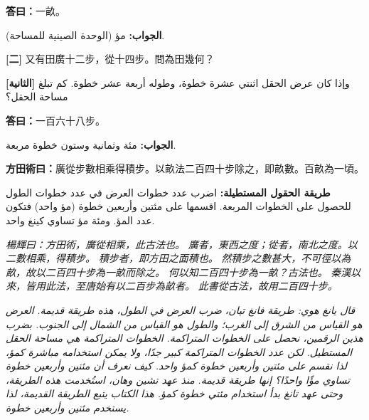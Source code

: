 \documentclass[11pt,a4paper]{article}
\newcommand{\bilingualrow}[2]{%
\noindent\begin{minipage}[t]{0.48\textwidth}#1\end{minipage}\hfill\begin{minipage}[t]{0.48\textwidth}\arabicfont\beginR #2\endR\end{minipage}\par\vspace{0.5cm}}
\begin{document}
\bilingualrow{
\textcolor{answercolor}{\textbf{答曰：}}一畝。
}{
\textcolor{answercolor}{\textbf{الجواب:}} مؤ (الوحدة الصينية للمساحة).
}

\bilingualrow{
\textbf{[二]} 又有田廣十二步，從十四步。問為田幾何？
}{
\textbf{[الثانية]} وإذا كان عرض الحقل اثنتي عشرة خطوة، وطوله أربعة عشر خطوة. كم تبلغ مساحة الحقل؟
}

\bilingualrow{
\textcolor{answercolor}{\textbf{答曰：}}一百六十八步。
}{
\textcolor{answercolor}{\textbf{الجواب:}} مئة وثمانية وستون خطوة مربعة.
}

\vspace{0.5em}

\bilingualrow{
\textcolor{methodcolor}{\textbf{方田術曰：}}廣從步數相乘得積步。以畝法二百四十步除之，即畝數。百畝為一頃。
}{
\textcolor{methodcolor}{\textbf{طريقة الحقول المستطيلة:}} اضرب عدد خطوات العرض في عدد خطوات الطول للحصول على الخطوات المربعة. اقسمها على مئتين وأربعين خطوة (مؤ واحد) فتكون عدد المؤ. ومئة مؤ تساوي كينغ واحد.
}

\bilingualrow{
\textcolor{commentarycolor}{\small\textit{楊輝曰：方田術，廣從相乘，此古法也。}}
\textcolor{commentarycolor}{\small\textit{廣者，東西之度；從者，南北之度。以二數相乘，得積步。}}
\textcolor{commentarycolor}{\small\textit{積步者，即方田之面積也。}}
\textcolor{commentarycolor}{\small\textit{然積步之數甚大，不可徑以為畝，故以二百四十步為一畝而除之。}}
\textcolor{commentarycolor}{\small\textit{何以知二百四十步為一畝？古法也。}}
\textcolor{commentarycolor}{\small\textit{秦漢以來，皆用此法，至唐始有以二百步為畝者。}}
\textcolor{commentarycolor}{\small\textit{此書從古法，故用二百四十步。}}
}{
\textcolor{commentarycolor}{\small\textit{قال يانغ هوي: طريقة فانغ تيان، ضرب العرض في الطول، هذه طريقة قديمة.}}
\textcolor{commentarycolor}{\small\textit{العرض هو القياس من الشرق إلى الغرب؛ والطول هو القياس من الشمال إلى الجنوب. بضرب هذين الرقمين، نحصل على الخطوات المتراكمة.}}
\textcolor{commentarycolor}{\small\textit{الخطوات المتراكمة هي مساحة الحقل المستطيل.}}
\textcolor{commentarycolor}{\small\textit{لكن عدد الخطوات المتراكمة كبير جدًا، ولا يمكن استخدامه مباشرة كمؤ، لذا نقسم على مئتين وأربعين خطوة كمؤ واحد.}}
\textcolor{commentarycolor}{\small\textit{كيف نعرف أن مئتين وأربعين خطوة تساوي مؤًا واحدًا؟ إنها طريقة قديمة.}}
\textcolor{commentarycolor}{\small\textit{منذ عهد تشين وهان، استُخدمت هذه الطريقة، وحتى عهد تانغ بدأ استخدام مئتي خطوة كمؤ.}}
\textcolor{commentarycolor}{\small\textit{هذا الكتاب يتبع الطريقة القديمة، لذا يستخدم مئتين وأربعين خطوة.}}
}

\vspace{1em}
\end{document}
